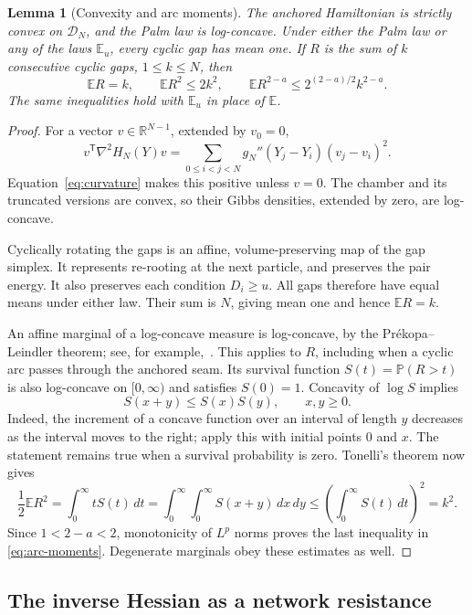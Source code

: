 \documentclass[11pt]{article}
\newtheorem{lemma}[theorem]{Lemma}
\theoremstyle{remark}\newtheorem{remark}[theorem]{Remark}
\newcommand{\E}{\mathbb E}
\newcommand{\Prob}{\mathbb P}
\newcommand{\R}{\mathbb R}
\begin{document}
\begin{lemma}[Convexity and arc moments]\label{lem:convexity}
The anchored Hamiltonian is strictly convex on $\mathcal D_N$,
and the Palm law is log-concave.  Under either the Palm law or any
of the laws $\E_u$, every cyclic gap has mean one.  If $R$ is the
sum of $k$ consecutive cyclic gaps, $1\le k\le N$, then
\begin{equation}\label{eq:arc-moments}
 \E R=k,\qquad \E R^2\le2k^2,\qquad
 \E R^{2-a}\le2^{(2-a)/2}k^{2-a}.
\end{equation}
The same inequalities hold with $\E_u$ in place of $\E$.
\end{lemma}
\begin{proof}
For a vector $v\in\R^{N-1}$, extended by $v_0=0$,
\begin{equation}\label{eq:hessian-form}
 v^{\mathsf T}\nabla^2H_N(Y)v
   =\sum_{0\le i<j<N}g_N''(Y_j-Y_i)(v_j-v_i)^2.
\end{equation}
Equation~\eqref{eq:curvature} makes this positive unless $v=0$.
The chamber and its truncated versions are convex, so their
Gibbs densities, extended by zero, are log-concave.

Cyclically rotating the gaps is an affine, volume-preserving map
of the gap simplex.  It represents re-rooting at the next particle,
and preserves the pair energy.  It also preserves each condition
$D_i\ge u$.  All gaps therefore have equal means under either
law.  Their sum is $N$, giving mean one and hence $\E R=k$.

An affine marginal of a log-concave measure is log-concave, by the
Pr\'ekopa--Leindler theorem; see, for example,~\cite{BL}.  This
applies to $R$, including when a cyclic arc passes through the
anchored seam.  Its survival function $S(t)=\Prob(R>t)$ is also
log-concave on $[0,\infty)$ and satisfies $S(0)=1$.  Concavity of
$\log S$ implies
\[
 S(x+y)\le S(x)S(y),\qquad x,y\ge0.
\]
Indeed, the increment of a concave function over an interval of
length $y$ decreases as the interval moves to the right; apply
this with initial points $0$ and $x$.  The statement remains true
when a survival probability is zero.  Tonelli's theorem now gives
\[
 \frac12\E R^2
  =\int_0^\infty tS(t)\,dt
  =\int_0^\infty\!\int_0^\infty S(x+y)\,dx\,dy
  \le\left(\int_0^\infty S(t)\,dt\right)^2=k^2.
\]
Since $1<2-a<2$, monotonicity of $L^p$ norms proves the last
inequality in \eqref{eq:arc-moments}.  Degenerate marginals obey
these estimates as well.
\end{proof}

\subsection{The inverse Hessian as a network resistance}
\end{document}
